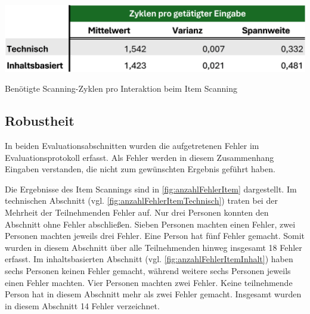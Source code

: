 
\begin{table}[tbh]
    \centering
    \includegraphics{images/Results/Zyklen-Item.png}
    \caption{Benötigte Scanning-Zyklen pro Interaktion beim Item Scanning}
    \label{tab:zyklen}
\end{table}

\subsection{Robustheit}

In beiden Evaluationsabschnitten wurden die aufgetretenen Fehler im Evaluationsprotokoll erfasst. Als Fehler werden in diesem Zusammenhang Eingaben verstanden, die nicht zum gewünschten Ergebnis geführt haben. 

Die Ergebnisse des Item Scannings sind in \autoref{fig:anzahlFehlerItem} dargestellt. Im technischen Abschnitt (vgl. \autoref{fig:anzahlFehlerItemTechnisch}) traten bei der Mehrheit der Teilnehmenden Fehler auf. Nur drei Personen konnten den Abschnitt ohne Fehler abschließen. Sieben Personen machten einen Fehler, zwei Personen machten jeweils drei Fehler. Eine Person hat fünf Fehler gemacht. Somit wurden in diesem Abschnitt über alle Teilnehmenden hinweg insgesamt 18 Fehler erfasst.
Im inhaltsbasierten Abschnitt (vgl. \autoref{fig:anzahlFehlerItemInhalt}) haben sechs Personen keinen Fehler gemacht, während weitere sechs Personen jeweils einen Fehler machten. Vier Personen machten zwei Fehler. Keine teilnehmende Person hat in diesem Abschnitt mehr als zwei Fehler gemacht. Insgesamt wurden in diesem Abschnitt 14 Fehler verzeichnet.

